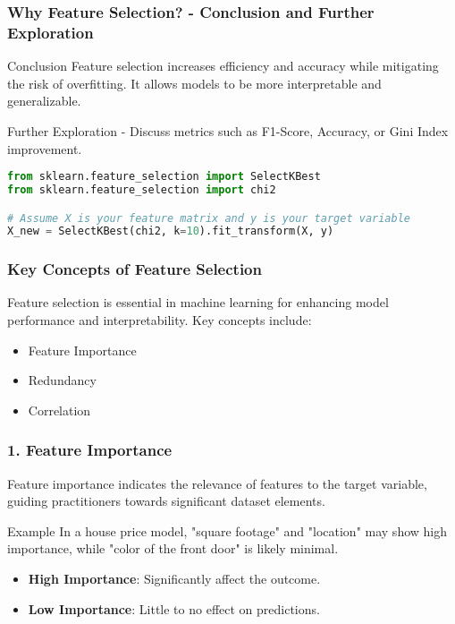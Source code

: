 \documentclass{beamer}
\begin{document}
\begin{frame}[fragile]
    \frametitle{Why Feature Selection? - Conclusion and Further Exploration}
    \begin{block}{Conclusion}
        Feature selection increases efficiency and accuracy while mitigating the risk of overfitting. It allows models to be more interpretable and generalizable.
    \end{block}
    \begin{block}{Further Exploration}
        - Discuss metrics such as F1-Score, Accuracy, or Gini Index improvement.
    \end{block}
    \begin{lstlisting}[language=Python, basicstyle=\tiny]
from sklearn.feature_selection import SelectKBest
from sklearn.feature_selection import chi2

# Assume X is your feature matrix and y is your target variable
X_new = SelectKBest(chi2, k=10).fit_transform(X, y)
    \end{lstlisting}
\end{frame}

\begin{frame}[fragile]
    \frametitle{Key Concepts of Feature Selection}
    Feature selection is essential in machine learning for enhancing model performance and interpretability. Key concepts include:
    \begin{itemize}
        \item Feature Importance
        \item Redundancy
        \item Correlation
    \end{itemize}
\end{frame}

\begin{frame}[fragile]
    \frametitle{1. Feature Importance}
    Feature importance indicates the relevance of features to the target variable, guiding practitioners towards significant dataset elements.

    \begin{block}{Example}
        In a house price model, "square footage" and "location" may show high importance, while "color of the front door" is likely minimal.
    \end{block}
    
    \begin{itemize}
        \item \textbf{High Importance}: Significantly affect the outcome.
        \item \textbf{Low Importance}: Little to no effect on predictions.
    \end{itemize}
\end{frame}
\end{document}

